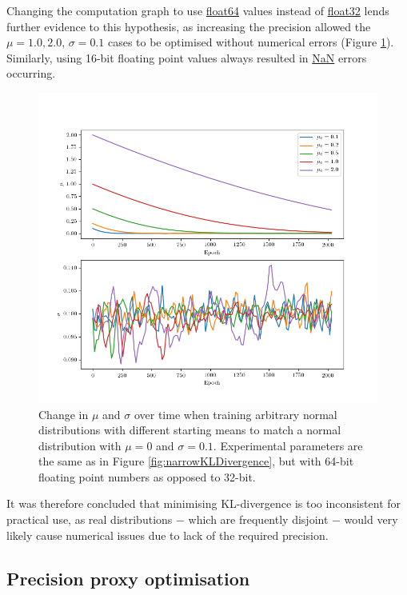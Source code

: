 \documentclass[../../main.tex]{subfiles}
\begin{document}
Changing the computation graph to use \url{float64} values instead of \url{float32} lends further evidence to this hypothesis, as increasing the precision allowed the $\mu=1.0, 2.0$, $\sigma=0.1$ cases to be optimised without numerical errors (Figure \ref{fig:narrowKLDivergenceFloat64}).
Similarly, using 16-bit floating point values always resulted in \url{NaN} errors occurring.
\begin{figure}[H]
    \begin{center}
    \includegraphics[width=\textwidth]{narrowKLDivergenceFloat64}
    \caption{
        Change in $\mu$ and $\sigma$ over time when training arbitrary normal distributions with different starting means to match a normal distribution with $\mu=0$ and $\sigma=0.1$. 
        Experimental parameters are the same as in Figure \ref{fig:narrowKLDivergence}, but with 64-bit floating point numbers as opposed to 32-bit.
    }
    \label{fig:narrowKLDivergenceFloat64}
    \end{center}
\end{figure}
It was therefore concluded that minimising KL-divergence is too inconsistent for practical use, as real distributions $-$ which are frequently disjoint $-$ would very likely cause numerical issues due to lack of the required precision.

\subsection{Precision proxy optimisation}
\end{document}
